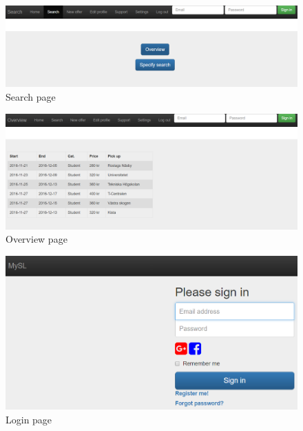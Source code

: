 \documentclass[11pt,twoside,a4paper]{report}
\begin{document}
\begin{appendices}
\begin{figure}
	\centering
	\includegraphics[width=\textwidth]{webapp-search.png}
	\caption{Search page}
	\label{figure:search-page}
\end{figure}

\begin{figure}
	\centering
	\includegraphics[width=\textwidth]{webapp-overview.png}
	\caption{Overview page}
	\label{figure:overview-page}
\end{figure}

\begin{figure}
	\centering
	\includegraphics[width=\textwidth]{webapp-login.png}
	\caption{Login page}
	\label{figure:login-page}
\end{figure}


\end{appendices}
\end{document}
